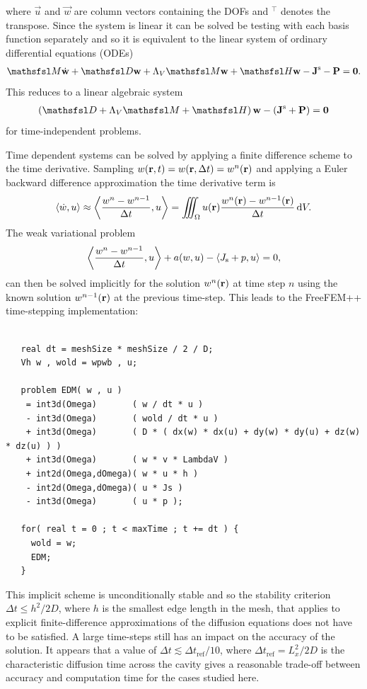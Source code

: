 \documentclass[a4paper]{article}
\numberwithin{equation}{section}
\begin{document}
where $\vec{u}$ and $\vec{w}$ are column vectors containing the DOFs and ${}^\intercal$ denotes the transpose. 
Since the system is linear it can be solved be testing with each basis function separately and so it is
equivalent to the linear system of ordinary differential equations (ODEs)
\begin{align}
\mM \dot{\vec{w}} + \mD \vec{w} +\Lambda_V \mM \vec{w}+ \mH \vec{w}
-\vec{J}^\rs -\vec{P} = \vzero.
\end{align}
This reduces to a linear algebraic system 
\begin{align}
\left( \mD +\Lambda_V \mM + \mH \right) \vec{w} - \left( \vec{J}^\rs + \vec{P} \right) = \vzero
\end{align}
for time-independent problems. 

Time dependent systems can be solved by applying a finite difference
scheme to the time derivative. Sampling $w(\boldsymbol{\mathrm{r}},t)=w(\boldsymbol{\mathrm{r}},\Delta t)=w^n(\boldsymbol{\mathrm{r}})$
and applying a Euler backward difference approximation the time
derivative term is
\begin{align}
\langle \dot{w},u \rangle \approx
\left\langle \frac{w^n-w^{n-1}}{\Delta t},u \right\rangle
=\iiint_{\Omega} u(\boldsymbol{\mathrm{r}})  \frac{w^n(\boldsymbol{\mathrm{r}})-w^{n-1}(\boldsymbol{\mathrm{r}})}{\Delta t} \,\mathrm{d}{V}.
\end{align}
The weak variational problem
\begin{align}
\left\langle \frac{w^n-w^{n-1}}{\Delta t},u \right\rangle
+ a(w,u) - \langle J_{\mathrm{s}}+p ,u \rangle = 0,
\end{align}
can then be solved implicitly for the solution $w^n(\boldsymbol{\mathrm{r}})$ at time step $n$
using the known solution $w^{n-1}(\boldsymbol{\mathrm{r}})$ at the previous time-step. This 
leads to the FreeFEM++ time-stepping implementation:
\begin{verbatim}

   real dt = meshSize * meshSize / 2 / D;
   Vh w , wold = wpwb , u;

   problem EDM( w , u ) 
    = int3d(Omega)       ( w / dt * u )
    - int3d(Omega)       ( wold / dt * u )
    + int3d(Omega)       ( D * ( dx(w) * dx(u) + dy(w) * dy(u) + dz(w) * dz(u) ) )
    + int3d(Omega)       ( w * v * LambdaV )
    + int2d(Omega,dOmega)( w * u * h )   
    - int2d(Omega,dOmega)( u * Js )
    - int3d(Omega)       ( u * p );
    
   for( real t = 0 ; t < maxTime ; t += dt ) {
     wold = w;
     EDM;
   }

\end{verbatim}
This implicit scheme is unconditionally stable and so the stability criterion 
$\Delta t \leq h^2/2D$, where $h$ is the smallest edge length in the mesh, 
that applies to explicit finite-difference approximations of
the diffusion equations does not have to be satisfied. A large time-steps still
has an impact on the accuracy of the solution. It appears that a value of
$\Delta t \lesssim {\Delta t}_\mathrm{ref} / 10$, where ${\Delta t}_\mathrm{ref}=L_x^2/2D$
is the characteristic diffusion time across the cavity gives a reasonable trade-off between accuracy
and computation time for the cases studied here.
\end{document}
